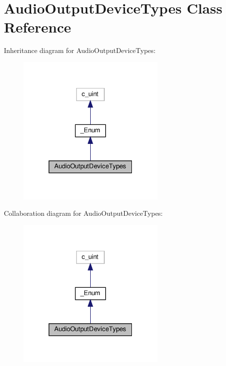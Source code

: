 \hypertarget{classvlc_1_1_audio_output_device_types}{}\section{Audio\+Output\+Device\+Types Class Reference}
\label{classvlc_1_1_audio_output_device_types}


Inheritance diagram for Audio\+Output\+Device\+Types\+:
\nopagebreak
\begin{figure}[H]
\begin{center}
\leavevmode
\includegraphics[width=208pt]{classvlc_1_1_audio_output_device_types__inherit__graph}
\end{center}
\end{figure}


Collaboration diagram for Audio\+Output\+Device\+Types\+:
\nopagebreak
\begin{figure}[H]
\begin{center}
\leavevmode
\includegraphics[width=208pt]{classvlc_1_1_audio_output_device_types__coll__graph}
\end{center}
\end{figure}
